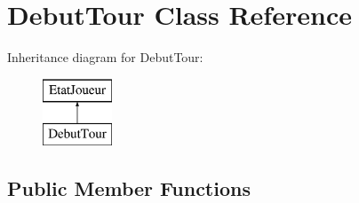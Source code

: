 \hypertarget{class_debut_tour}{\section{Debut\-Tour Class Reference}
\label{class_debut_tour}
}
Inheritance diagram for Debut\-Tour\-:\begin{figure}[H]
\begin{center}
\leavevmode
\includegraphics[height=2.000000cm]{class_debut_tour}
\end{center}
\end{figure}
\subsection*{Public Member Functions}
